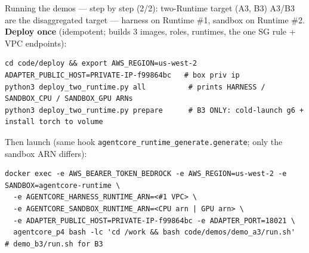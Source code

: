 \documentclass[aspectratio=169]{beamer}
\begin{document}
\begin{frame}[fragile]{Running the demos --- step by step (2/2): two-Runtime target (A3, B3)}
  \footnotesize A3/B3 are the disaggregated target --- harness on Runtime \#1, sandbox on Runtime \#2.
  \textbf{Deploy once} (idempotent; builds 3 images, roles, runtimes, the one SG rule + VPC endpoints):
\begin{lstlisting}[basicstyle=\ttfamily\scriptsize]
cd code/deploy && export AWS_REGION=us-west-2 ADAPTER_PUBLIC_HOST=PRIVATE-IP-f99864bc   # box priv ip
python3 deploy_two_runtime.py all          # prints HARNESS / SANDBOX_CPU / SANDBOX_GPU ARNs
python3 deploy_two_runtime.py prepare      # B3 ONLY: cold-launch g6 + install torch to volume
\end{lstlisting}
  \vspace{-0.3em}Then launch (same hook \texttt{agentcore\_runtime\_generate.generate}; only the sandbox ARN differs):
\begin{lstlisting}[basicstyle=\ttfamily\scriptsize]
docker exec -e AWS_BEARER_TOKEN_BEDROCK -e AWS_REGION=us-west-2 -e SANDBOX=agentcore-runtime \
  -e AGENTCORE_HARNESS_RUNTIME_ARN=<#1 VPC> \
  -e AGENTCORE_SANDBOX_RUNTIME_ARN=<CPU arn | GPU arn> \
  -e ADAPTER_PUBLIC_HOST=PRIVATE-IP-f99864bc -e ADAPTER_PORT=18021 \
  agentcore_p4 bash -lc 'cd /work && bash code/demos/demo_a3/run.sh'   # demo_b3/run.sh for B3
\end{lstlisting}
\end{frame}
\end{document}
